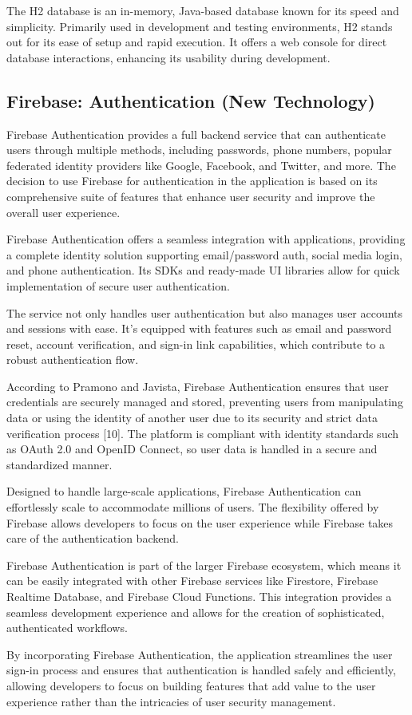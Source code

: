 The H2 database is an in-memory, Java-based database known for its speed and simplicity. 
Primarily used in development and testing environments, H2 stands out for its ease of setup and rapid execution. 
It offers a web console for direct database interactions, enhancing its usability during development.




\subsection{Firebase: Authentication (New Technology)}

Firebase Authentication provides a full backend service that can authenticate users through multiple methods, including passwords, phone numbers, popular federated identity providers like Google, Facebook, and Twitter, and more. The decision to use Firebase for authentication in the application is based on its comprehensive suite of features that enhance user security and improve the overall user experience.

Firebase Authentication offers a seamless integration with applications, providing a complete identity solution supporting email/password auth, social media login, and phone authentication. Its SDKs and ready-made UI libraries allow for quick implementation of secure user authentication.

The service not only handles user authentication but also manages user accounts and sessions with ease. It's equipped with features such as email and password reset, account verification, and sign-in link capabilities, which contribute to a robust authentication flow.

According to Pramono and Javista, Firebase Authentication ensures that user credentials are securely managed and stored, preventing users from manipulating data or using the identity of another user due to its security and strict data verification process [10]. The platform is compliant with identity standards such as OAuth 2.0 and OpenID Connect, so user data is handled in a secure and standardized manner.

Designed to handle large-scale applications, Firebase Authentication can effortlessly scale to accommodate millions of users. The flexibility offered by Firebase allows developers to focus on the user experience while Firebase takes care of the authentication backend.

Firebase Authentication is part of the larger Firebase ecosystem, which means it can be easily integrated with other Firebase services like Firestore, Firebase Realtime Database, and Firebase Cloud Functions. This integration provides a seamless development experience and allows for the creation of sophisticated, authenticated workflows.

By incorporating Firebase Authentication, the application streamlines the user sign-in process and ensures that authentication is handled safely and efficiently, allowing developers to focus on building features that add value to the user experience rather than the intricacies of user security management.
